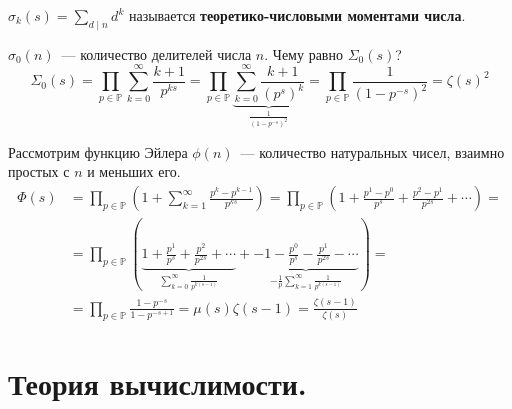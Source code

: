 \documentclass{article}
\begin{document}
    \begin{definition}
        $\sigma_k(s)=\sum\limits_{d\mathrel|n}d^k$ называется \textbf{теоретико-числовыми моментами числа}.
    \end{definition}
    \begin{example}
        $\sigma_0(n)$~--- количество делителей числа $n$. Чему равно $\Sigma_0(s)$?
        $$
        \Sigma_0(s)=\prod\limits_{p\in\mathbb P}\sum\limits_{k=0}^\infty\frac{k+1}{p^{ks}}=
        \prod\limits_{p\in\mathbb P}\underbrace{\sum\limits_{k=0}^\infty\frac{k+1}{(p^s)^k}}_{\frac1{(1-p^{-s})^2}}=
        \prod\limits_{p\in\mathbb P}\frac1{(1-p^{-s})^2}=\zeta(s)^2
        $$
    \end{example}
    \begin{example}
        Рассмотрим функцию Эйлера $\phi(n)$~--- количество натуральных чисел, взаимно простых с $n$ и меньших его.
        \[\begin{split}
            \Phi(s)&=\prod\limits_{p\in\mathbb P}\left(1+\sum\limits_{k=1}^\infty\frac{p^k-p^{k-1}}{p^{ks}}\right)=\prod\limits_{p\in\mathbb P}\left(1+\frac{p^1-p^0}{p^s}+\frac{p^2-p^1}{p^{2s}}+\cdots\right)=\\
            &=\prod\limits_{p\in\mathbb P}\left(\underbrace{1+\frac{p^1}{p^s}+\frac{p^2}{p^{2s}}+\cdots}_{\sum\limits_{k=0}^\infty\frac1{p^{k(s-1)}}}+\underbrace{-1-\frac{p^0}{p^s}-\frac{p^1}{p^{2s}}-\cdots}_{-\frac1p\sum\limits_{k=1}^\infty\frac1{p^{k(s-1)}}}\right)=\\
            &=\prod\limits_{p\in\mathbb P}\frac{1-p^{-s}}{1-p^{-s+1}}=\mu(s)\zeta(s-1)=\frac{\zeta(s-1)}{\zeta(s)}
        \end{split}\]
    \end{example}
    \section{Теория вычислимости.}
\end{document}
